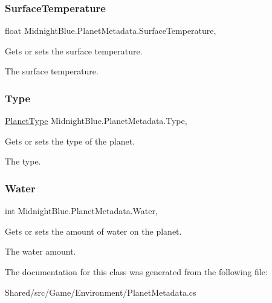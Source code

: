 \subsubsection{\texorpdfstring{Surface\+Temperature}{SurfaceTemperature}}
{\footnotesize\ttfamily float Midnight\+Blue.\+Planet\+Metadata.\+Surface\+Temperature\hspace{0.3cm}{\ttfamily [get]}, {\ttfamily [set]}}



Gets or sets the surface temperature. 

The surface temperature.\hypertarget{class_midnight_blue_1_1_planet_metadata_a9d8ec38e5924a68970df4795c6185971}{}\label{class_midnight_blue_1_1_planet_metadata_a9d8ec38e5924a68970df4795c6185971} 
\subsubsection{\texorpdfstring{Type}{Type}}
{\footnotesize\ttfamily \hyperlink{namespace_midnight_blue_a4a799009a18b57979628708589ae53e3}{Planet\+Type} Midnight\+Blue.\+Planet\+Metadata.\+Type\hspace{0.3cm}{\ttfamily [get]}, {\ttfamily [set]}}



Gets or sets the type of the planet. 

The type.\hypertarget{class_midnight_blue_1_1_planet_metadata_a0b1319aa47d656c56cbcda678a938235}{}\label{class_midnight_blue_1_1_planet_metadata_a0b1319aa47d656c56cbcda678a938235} 
\subsubsection{\texorpdfstring{Water}{Water}}
{\footnotesize\ttfamily int Midnight\+Blue.\+Planet\+Metadata.\+Water\hspace{0.3cm}{\ttfamily [get]}, {\ttfamily [set]}}



Gets or sets the amount of water on the planet. 

The water amount.

The documentation for this class was generated from the following file\+:\begin{DoxyCompactItemize}
\item 
Shared/src/\+Game/\+Environment/Planet\+Metadata.\+cs\end{DoxyCompactItemize}

